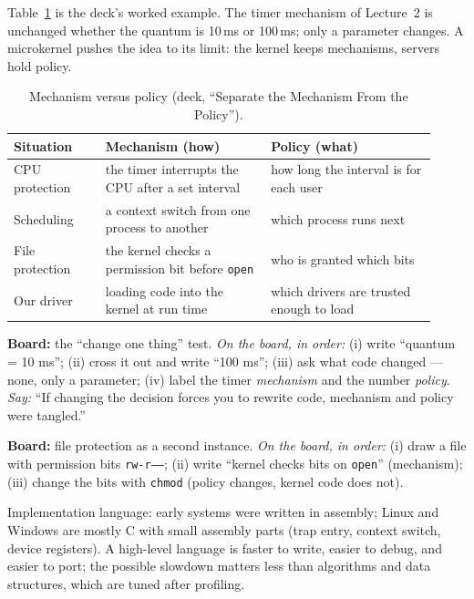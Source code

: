 \documentclass[11pt]{article}
\begin{document}
Table~\ref{tab:mechpol} is the deck's worked example. The timer mechanism of Lecture~2 is unchanged whether the quantum is 10\,ms or 100\,ms; only a parameter changes. A microkernel pushes the idea to its limit: the kernel keeps mechanisms, servers hold policy.

\begin{table}[h]
\centering
\small
\renewcommand{\arraystretch}{1.3}
\begin{tabular}{@{}>{\raggedright\arraybackslash}p{0.20\linewidth}>{\raggedright\arraybackslash}p{0.36\linewidth}>{\raggedright\arraybackslash}p{0.36\linewidth}@{}}
\toprule
\textbf{Situation} & \textbf{Mechanism (how)} & \textbf{Policy (what)} \\
\midrule
CPU protection & the timer interrupts the CPU after a set interval & how long the interval is for each user \\
Scheduling & a context switch from one process to another & which process runs next \\
File protection & the kernel checks a permission bit before \texttt{open} & who is granted which bits \\
Our driver & loading code into the kernel at run time & which drivers are trusted enough to load \\
\bottomrule
\end{tabular}
\caption{Mechanism versus policy (deck, ``Separate the Mechanism From the Policy'').}
\label{tab:mechpol}
\end{table}

\textbf{Board:} the ``change one thing'' test. \emph{On the board, in order:} (i) write ``quantum = 10 ms''; (ii) cross it out and write ``100 ms''; (iii) ask what code changed --- none, only a parameter; (iv) label the timer \emph{mechanism} and the number \emph{policy}. \emph{Say:} ``If changing the decision forces you to rewrite code, mechanism and policy were tangled.''

\textbf{Board:} file protection as a second instance. \emph{On the board, in order:} (i) draw a file with permission bits \texttt{rw-r-----}; (ii) write ``kernel checks bits on \texttt{open}'' (mechanism); (iii) change the bits with \texttt{chmod} (policy changes, kernel code does not).

Implementation language: early systems were written in assembly; Linux and Windows are mostly C with small assembly parts (trap entry, context switch, device registers). A high-level language is faster to write, easier to debug, and easier to port; the possible slowdown matters less than algorithms and data structures, which are tuned after profiling.
\end{document}
